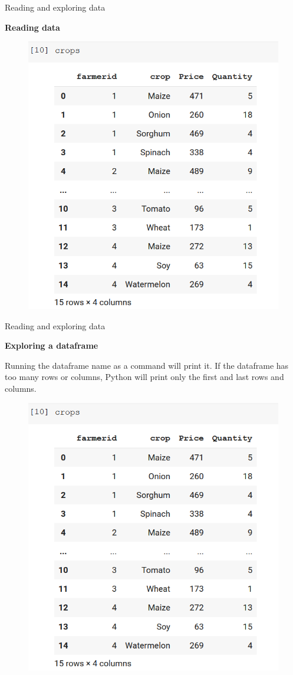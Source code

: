 \documentclass[aspectratio=169]{beamer}
\begin{document}
\begin{frame}{Reading and exploring data}

	\textbf{Reading data}

	\begin{figure}
		\centering
		\includegraphics[width=0.4\linewidth]{img/crops_df.png}
	\end{figure}

\end{frame}

\begin{frame}{Reading and exploring data}

	\textbf{Exploring a dataframe}

	Running the dataframe name as a command will print it. If the dataframe has too many rows or columns, Python will print only the first and last rows and columns.

	\begin{figure}
		\includegraphics[width=0.35\linewidth]{img/crops_df.png}
	\end{figure}

\end{frame}
\end{document}
